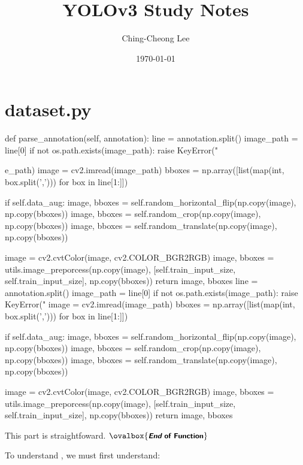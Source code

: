\documentclass[10pt,a4paper]{article}
\title{YOLOv3 Study Notes}
\author{
Ching-Cheong Lee
}
\date{\today}
\newcommand{\END}{\text{}\hfill$\ovalbox{\small\text{\bfseries\sffamily {\itshape End} of Function}}$\bigskip}
\begin{document}
\maketitle
\section{dataset.py}

\begin{py}
def parse_annotation(self, annotation):
    line = annotation.split()
    image_path = line[0]
    if not os.path.exists(image_path):
        raise KeyError("%
        
        e_path)
    image = cv2.imread(image_path)
    bboxes = np.array([list(map(int, box.split(','))) for box in line[1:]])

    if self.data_aug:
        image, bboxes = self.random_horizontal_flip(np.copy(image), np.copy(bboxes))
        image, bboxes = self.random_crop(np.copy(image), np.copy(bboxes))
        image, bboxes = self.random_translate(np.copy(image), np.copy(bboxes))

    image = cv2.cvtColor(image, cv2.COLOR_BGR2RGB)
    image, bboxes = utils.image_preporcess(np.copy(image), [self.train_input_size, self.train_input_size], np.copy(bboxes))
    return image, bboxes
    line = annotation.split()
    image_path = line[0]
    if not os.path.exists(image_path):
        raise KeyError("%
    image = cv2.imread(image_path)
    bboxes = np.array([list(map(int, box.split(','))) for box in line[1:]])

    if self.data_aug:
        image, bboxes = self.random_horizontal_flip(np.copy(image), np.copy(bboxes))
        image, bboxes = self.random_crop(np.copy(image), np.copy(bboxes))
        image, bboxes = self.random_translate(np.copy(image), np.copy(bboxes))

    image = cv2.cvtColor(image, cv2.COLOR_BGR2RGB)
    image, bboxes = utils.image_preporcess(np.copy(image), [self.train_input_size, self.train_input_size], np.copy(bboxes))
    return image, bboxes
\end{py}
This part is straightfoward. \END

To understand , we must first understand:
\end{document}
